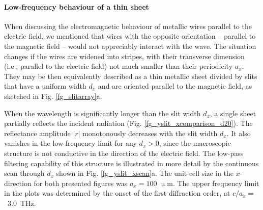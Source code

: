 \paragraph{Low-frequency behaviour of a thin sheet}%
When discussing the electromagnetic behaviour of metallic wires parallel to the electric field, we mentioned that wires with the opposite orientation -- parallel to the magnetic field -- would not appreciably interact with the wave. The situation changes if the wires are widened into stripes, with their transverse dimension (i.e., parallel to the electric field) not much smaller than their periodicity $a_x$. They may be then equivalently described as a thin metallic sheet divided by slits that have a uniform width $d_x$ and are oriented parallel to the magnetic field, as sketched in Fig. \ref{fg_slitarray}a.

When the wavelength is significantly longer than the slit width $d_x$, a single sheet partially reflects the incident radiation (Fig. \ref{fg_yslit_xcomparison_d20}). The reflectance amplitude $|r|$ mono\-to\-nously decreases with the slit width $d_x$.  It also vanishes in the low-frequency limit for any $d_x>0$, since the macroscopic structure is not conductive in the direction of the electric field.  The low-pass filtering capability of this structure is illustrated in more detail by the continuous scan through $d_x$ shown in Fig. \ref{fg_yslit_xscan}a. 
The unit-cell size in the $x$-direction for both presented figures was $a_x = 100$ $\upmu$m. 
The upper frequency limit in the plots was determined by the onset of the first diffraction order, at $c/a_x =$~3.0~THz. 

